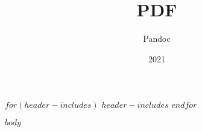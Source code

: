 \documentclass[$papersize$,$fontsize$]{desbeers-six-by-nine}
\title{PDF}
\author{Pandoc}
\date{2021}
\begin{document}
$for(header-includes)$
$header-includes$
$endfor$

\frontmatter

$body$
\end{document}
